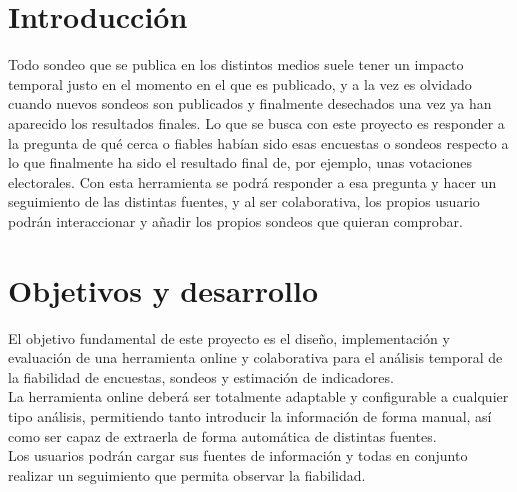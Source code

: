 
\section{Introducción}
\label{sec:introduccion}

Todo sondeo que se publica en los distintos medios suele tener un impacto temporal justo en el momento en el que es publicado, y a la vez es olvidado cuando nuevos sondeos son publicados y finalmente desechados una vez ya han aparecido los resultados finales. Lo que se busca con este proyecto es responder a la pregunta de qué cerca o fiables habían sido esas encuestas o sondeos respecto a lo que finalmente ha sido el resultado final de, por ejemplo, unas votaciones electorales.
Con esta herramienta se podrá responder a esa pregunta y hacer un seguimiento de las distintas fuentes, y al ser colaborativa, los propios usuario podrán interaccionar y añadir los propios sondeos que quieran comprobar. 


\section{Objetivos y desarrollo}
\label{sec:objetivos-y-campo}

El objetivo fundamental de este proyecto es el diseño, implementación y evaluación de una herramienta online y colaborativa para el análisis temporal de la fiabilidad de encuestas, sondeos y estimación de indicadores.\\
La herramienta online deberá ser totalmente adaptable y configurable a cualquier tipo análisis, permitiendo tanto introducir la información de forma manual, así como ser capaz de extraerla de forma automática de distintas fuentes.\\
Los usuarios podrán cargar sus fuentes de información y todas en conjunto realizar un seguimiento que permita observar la fiabilidad.


